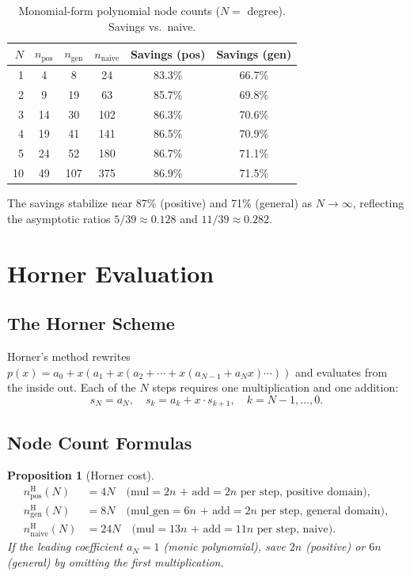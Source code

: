 \documentclass[11pt,a4paper]{article}
\newtheorem{proposition}[theorem]{Proposition}
\begin{document}
\begin{table}[h]
\centering
\caption{Monomial-form polynomial node counts ($N =$ degree). Savings vs.\ naive.}
\label{tab:monomial}
\begin{tabular}{rccccc}
\toprule
$N$ & $n_\text{pos}$ & $n_\text{gen}$ & $n_\text{naive}$ & Savings (pos) & Savings (gen) \\
\midrule
1  & 4  & 8   & 24  & 83.3\% & 66.7\% \\
2  & 9  & 19  & 63  & 85.7\% & 69.8\% \\
3  & 14 & 30  & 102 & 86.3\% & 70.6\% \\
4  & 19 & 41  & 141 & 86.5\% & 70.9\% \\
5  & 24 & 52  & 180 & 86.7\% & 71.1\% \\
10 & 49 & 107 & 375 & 86.9\% & 71.5\% \\
\bottomrule
\end{tabular}
\end{table}

The savings stabilize near 87\% (positive) and 71\% (general) as $N \to \infty$,
reflecting the asymptotic ratios $5/39 \approx 0.128$ and $11/39 \approx 0.282$.

\section{Horner Evaluation}

\subsection{The Horner Scheme}

Horner's method rewrites $p(x) = a_0 + x(a_1 + x(a_2 + \cdots + x(a_{N-1} + a_N x)\cdots))$
and evaluates from the inside out. Each of the $N$ steps requires one multiplication and one
addition:
\[
  s_{N} = a_N, \quad s_k = a_k + x \cdot s_{k+1}, \quad k = N-1, \ldots, 0.
\]

\subsection{Node Count Formulas}

\begin{proposition}[Horner cost]
\label{prop:horner}
  \begin{align*}
    n_\mathrm{pos}^\mathrm{H}(N) &= 4N \quad\text{(mul$=2n$ + add$=2n$ per step, positive domain)},\\
    n_\mathrm{gen}^\mathrm{H}(N) &= 8N \quad\text{(mul\_gen$=6n$ + add$=2n$ per step, general domain)},\\
    n_\mathrm{naive}^\mathrm{H}(N) &= 24N \quad\text{(mul$=13n$ + add$=11n$ per step, naive)}.
  \end{align*}
  If the leading coefficient $a_N = 1$ (monic polynomial), save $2n$ (positive) or $6n$
  (general) by omitting the first multiplication.
\end{proposition}
\end{document}
